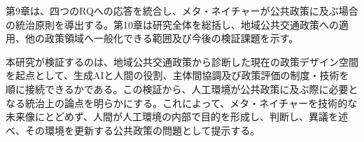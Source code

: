 第9章は、四つのRQへの応答を統合し、メタ・ネイチャーが公共政策に及ぶ場合の統治原則を導出する。第10章は研究全体を総括し、地域公共交通政策への適用、他の政策領域へ一般化できる範囲及び今後の検証課題を示す。

本研究が検証するのは、地域公共交通政策から診断した現在の政策デザイン空間を起点として、生成AIと人間の役割、主体間協調及び政策評価の制度・技術を順に接続できるかである。この検証から、人工環境が公共政策に及ぶ際に必要となる統治上の論点を明らかにする。これによって、メタ・ネイチャーを技術的な未来像にとどめず、人間が人工環境の内部で目的を形成し、判断し、異議を述べ、その環境を更新する公共政策の問題として提示する。

\printbibliography[heading=subbibliography,title={章末参考文献}]
